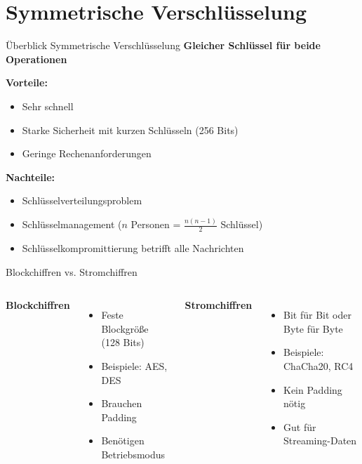 \documentclass[handout]{beamer}
\begin{document}
\section{Symmetrische Verschlüsselung}

\begin{frame}{Überblick Symmetrische Verschlüsselung}
\textbf{Gleicher Schlüssel für beide Operationen}\pause

\vspace{0.3cm}
\textbf{Vorteile:}
\begin{itemize}
    \item Sehr schnell
    \item Starke Sicherheit mit kurzen Schlüsseln (256 Bits)
    \item Geringe Rechenanforderungen
\end{itemize}
\pause
\vspace{0.3cm}
\textbf{Nachteile:}
\begin{itemize}
    \item Schlüsselverteilungsproblem
    \item Schlüsselmanagement ($n$ Personen = $\frac{n(n-1)}{2}$ Schlüssel)
    \item Schlüsselkompromittierung betrifft alle Nachrichten
\end{itemize}

\end{frame}

\begin{frame}{Blockchiffren vs. Stromchiffren}
\begin{columns}
\textbf{Blockchiffren}
\begin{itemize}
    \item Feste Blockgröße (128 Bits)
    \item Beispiele: AES, DES
    \item Brauchen Padding
    \item Benötigen Betriebsmodus
\end{itemize}
\pause

\textbf{Stromchiffren}
\begin{itemize}
    \item Bit für Bit oder Byte für Byte
    \item Beispiele: ChaCha20, RC4
    \item Kein Padding nötig
    \item Gut für Streaming-Daten
\end{itemize}
\end{columns}

\vspace{0.5cm}
\end{frame}
\end{document}
